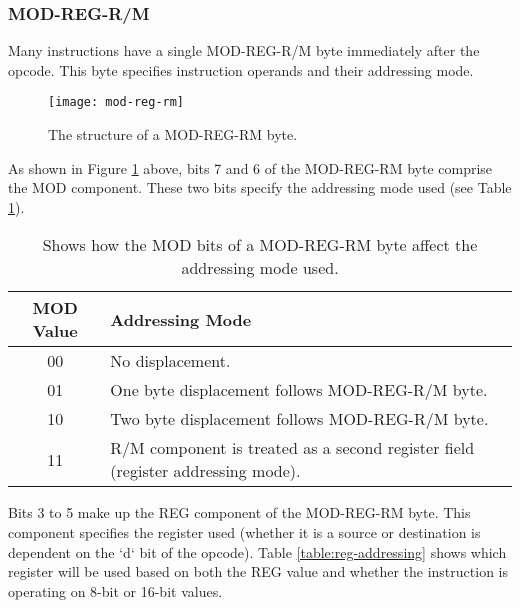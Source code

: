     \subsubsection{MOD-REG-R/M}
        Many instructions have a single MOD-REG-R/M byte immediately after the opcode. This byte specifies instruction operands and their addressing mode.

        \begin{figure}[h]
            \centering
            \texttt{[image: mod-reg-rm]}
            \caption{The structure of a MOD-REG-RM byte.}
            \label{fig:mod-reg-rm}
        \end{figure}

        As shown in Figure \ref{fig:mod-reg-rm} above, bits 7 and 6 of the MOD-REG-RM byte comprise the MOD component. These two bits specify the addressing mode used (see Table \ref{table:mod-addressing-mode}).

        \begin{table}[h]
            \centering
            \begin{tabular} { | c | m{} | }
                \hline
                MOD Value & Addressing Mode \\
                \hline
                00  & No displacement. \\
                01  & One byte displacement follows MOD-REG-R/M byte. \\
                10  & Two byte displacement follows MOD-REG-R/M byte. \\
                11  & R/M component is treated as a second register field (register addressing mode). \\
                \hline
            \end{tabular}
            \caption{Shows how the MOD bits of a MOD-REG-RM byte affect the addressing mode used.}
            \label{table:mod-addressing-mode}
        \end{table}

        Bits 3 to 5 make up the REG component of the MOD-REG-RM byte. This component specifies the register used (whether it is a source or destination is dependent on the `d` bit of the opcode). Table \ref{table:reg-addressing} shows which register will be used based on both the REG value and whether the instruction is operating on 8-bit or 16-bit values.

